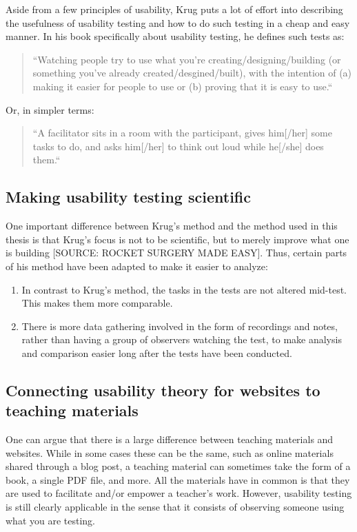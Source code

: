 Aside from a few principles of usability, Krug puts a lot of effort into describing the usefulness of usability testing and how to do such testing in a cheap and easy manner. In his book specifically about usability testing, he defines such tests as:

\begin{quote}
“Watching people try to use what you're creating/designing/building (or something you've already created/desgined/built), with the intention of (a) making it easier for people to use or (b) proving that it is easy to use.“
\end{quote}

Or, in simpler terms:

\begin{quote}
“A facilitator sits in a room with the participant, gives him[/her] some tasks to do, and asks him[/her] to think out loud while he[/she] does them.“
\end{quote}

\subsection{Making usability testing scientific}

One important difference between Krug's method and the method used in this thesis is that Krug's focus is not to be scientific, but to merely improve what one is building [SOURCE: ROCKET SURGERY MADE EASY]. Thus, certain parts of his method have been adapted to make it easier to analyze:

\begin{enumerate}
	\item In contrast to Krug's method, the tasks in the tests are not altered mid-test. This makes them more comparable.
	\item There is more data gathering involved in the form of recordings and notes, rather than having a group of observers watching the test, to make analysis and comparison easier long after the tests have been conducted.
\end{enumerate}

\subsection{Connecting usability theory for websites to teaching materials}

One can argue that there is a large difference between teaching materials and websites. While in some cases these can be the same, such as online materials shared through a blog post, a teaching material can sometimes take the form of a book, a single PDF file, and more. All the materials have in common is that they are used to facilitate and/or empower a teacher's work. However, usability testing is still clearly applicable in the sense that it consists of observing someone using what you are testing.

